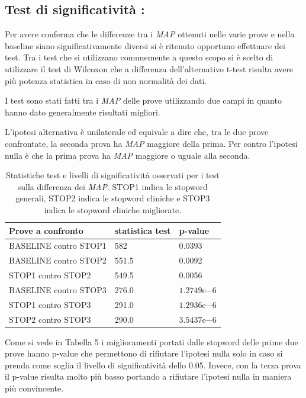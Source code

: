 \documentclass[runningheads]{llncs}
\begin{document}
\subsection{Test di significativit\`a :}
\vspace{-5mm}
Per avere conferma che le differenze tra i \textit{MAP} ottenuti nelle varie prove e nella baseline
siano significativamente diversi si \`e ritenuto opportuno effettuare dei test.
Tra i test che si utilizzano comunemente a questo scopo si \`e scelto di utilizzare il
test di Wilcoxon che a differenza dell'alternativo t-test risulta avere pi\`u
potenza statistica in caso di non normalit\`a dei dati.

I test sono stati fatti tra i \textit{MAP} delle prove utilizzando due campi in quanto hanno
dato generalmente risultati migliori.

L'ipotesi alternativa \`e unilaterale ed equivale a dire che, tra le due prove
confrontate, la seconda prova ha \textit{MAP} maggiore della prima.
Per contro l'ipotesi nulla \`e che la prima prova ha \textit{MAP} maggiore o uguale alla seconda.

\begin{table}
\centering
\begin{tabular}{lll}
\hline
\textbf{ Prove a confronto }  & \textbf{ statistica test }  & \textbf{ p-value }            \\ \hline
 BASELINE contro STOP1  &  582      &  0.0393       \\
 BASELINE contro STOP2  &  551.5    &  0.0092       \\
 STOP1 contro STOP2     &  549.5    &  0.0056       \\
 BASELINE contro STOP3  &  276.0    &  $1.2749\mathrm{e}{-6}$   \\
 STOP1 contro STOP3     &  291.0    &  $1.2936\mathrm{e}{-6}$   \\
 STOP2 contro STOP3     &  290.0    &  $3.5437\mathrm{e}{-6}$   \\ \hline
\end{tabular}

\caption{ Statistiche test e livelli di significativit\`a osservati per i test sulla differenza dei \textit{MAP}.
STOP1 indica le stopword generali, STOP2 indica le stopword cliniche e STOP3 indica le stopword cliniche migliorate.}
\vspace{-5mm}
\end{table}

Come si vede in Tabella 5 i miglioramenti portati dalle stopword delle prime due prove hanno p-value che permettono di rifiutare l'ipotesi nulla solo in caso si prenda come soglia il livello di significativit\`a dello 0.05.
Invece, con la terza prova il p-value risulta molto pi\`u basso portando a rifiutare l'ipotesi nulla in maniera pi\`u convincente.
\end{document}
